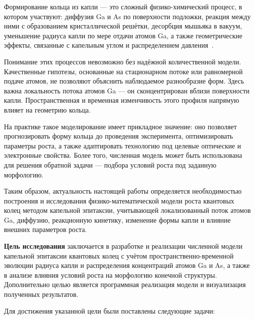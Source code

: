 \documentclass[14pt,oneside]{extarticle}
\begin{document}
Формирование кольца из капли — это сложный физико-химический процесс, в котором участвуют: диффузия Ga и As по поверхности подложки, реакция между ними с образованием кристаллической решётки, десорбция мышьяка в вакуум, уменьшение радиуса капли по мере отдачи атомов Ga, а также геометрические эффекты, связанные с капельным углом и распределением давления~\cite{Li2009, 2008GrowthMechanisms}.

Понимание этих процессов невозможно без надёжной количественной модели. Качественные гипотезы, основанные на стационарном потоке или равномерной подаче атомов, не позволяют объяснить наблюдаемое разнообразие форм. Здесь важна локальность потока атомов Ga — он сконцентрирован вблизи поверхности капли. Пространственная и временная изменчивость этого профиля напрямую влияет на геометрию кольца.

На практике такое моделирование имеет прикладное значение: оно позволяет прогнозировать форму кольца до проведения эксперимента, оптимизировать параметры роста, а также адаптировать технологию под целевые оптические и электронные свойства. Более того, численная модель может быть использована для решения обратной задачи — подбора условий роста под заданную морфологию.

Таким образом, актуальность настоящей работы определяется необходимостью построения и исследования физико-математической модели роста квантовых колец методом капельной эпитаксии, учитывающей локализованный поток атомов Ga, диффузию, реакционную кинетику, изменение формы капли и влияние внешних параметров роста.


\textbf{Цель исследования} заключается в разработке и реализации численной модели капельной эпитаксии квантовых колец с учётом пространственно-временной эволюции радиуса капли и распределения концентраций атомов Ga и As, а также в анализе влияния условий роста на морфологию конечной структуры. Дополнительно целью является программная реализация модели и визуализация полученных результатов.

Для достижения указанной цели были поставлены следующие задачи:
\end{document}

